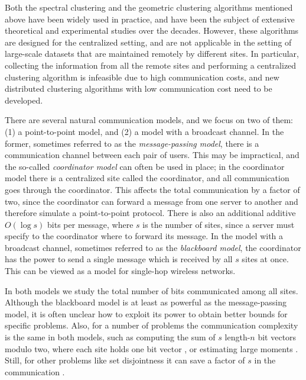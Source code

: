 Both the spectral clustering and the geometric clustering algorithms mentioned above have been widely used in practice, and have been the subject of extensive theoretical and experimental studies over the decades. However, these algorithms are designed for the centralized setting, and are not applicable in the setting of large-scale datasets that are maintained remotely by different sites.
In particular, collecting the information from all the remote sites and performing a centralized clustering algorithm is infeasible due to high communication costs, and new distributed clustering algorithms with low communication cost need to be developed.

There are several natural communication models, and we focus on two of them: (1) a point-to-point model, and (2) a model with a broadcast channel. In the former, sometimes referred to as the {\it message-passing model}, there is a communication channel between each pair of users. This may be impractical, and the so-called {\it coordinator model} can often be used in place; in the coordinator model there is a centralized site called the coordinator, and all communication goes through the coordinator. This affects the total communication by a factor of two, since the coordinator can forward a message from one server to another and therefore simulate a point-to-point protocol. There is also an additional additive $O(\log s)$ bits per message, where $s$ is the number of sites, since a server must specify to the coordinator where to forward its message. In the model with a broadcast channel, sometimes referred to as the {\it blackboard model}, the coordinator has the power to send a single message which is received by all $s$ sites at once. This
can be viewed as a model for single-hop wireless networks.

In both models we study the total number of bits
communicated among all sites. Although the blackboard model is at least as powerful as the
message-passing model, it is often unclear how to exploit its power to obtain better bounds for specific problems.
Also, for a number of problems the communication complexity is the same in both models, such as computing
the sum of $s$ length-$n$ bit vectors modulo two, where each site holds one bit vector \cite{pvz16}, or estimating large moments \cite{wz12}. Still,
for other problems like set disjointness it can save a factor of $s$ in the communication
\cite{beopv13}.

